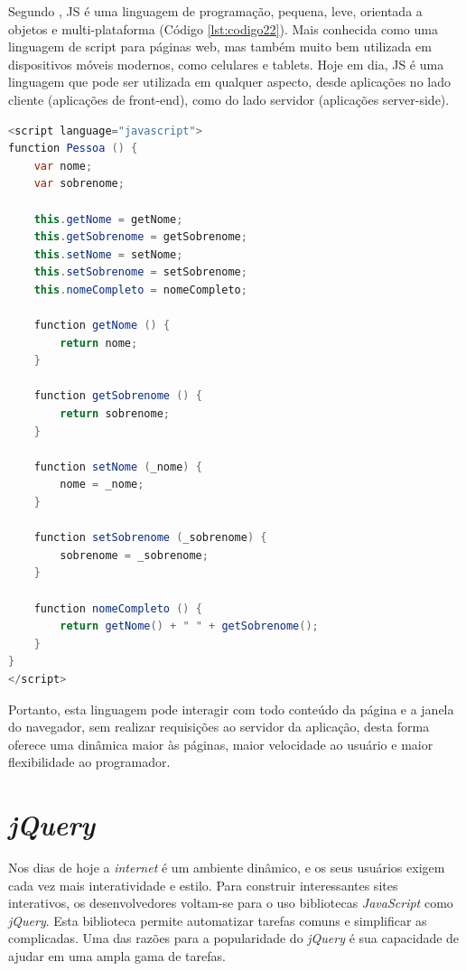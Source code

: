 Segundo , JS é uma linguagem de programação, pequena, leve, orientada a objetos e multi-plataforma (Código \ref{lst:codigo22}). Mais conhecida como uma linguagem de script para páginas web, mas também muito bem utilizada em dispositivos móveis modernos, como celulares e tablets. Hoje em dia, JS é uma linguagem que pode ser utilizada em qualquer aspecto, desde aplicações no lado cliente (aplicações de front-end), como do lado servidor (aplicações server-side).

{\singlespace
\begin{lstlisting}[caption=Classe Pessoa em \textit{JavaScript},language=Java,label={lst:codigo22}]
<script language="javascript">
function Pessoa () {
    var nome;
    var sobrenome;

    this.getNome = getNome;
    this.getSobrenome = getSobrenome;
    this.setNome = setNome;
    this.setSobrenome = setSobrenome;
    this.nomeCompleto = nomeCompleto;

    function getNome () {
        return nome;
    }

    function getSobrenome () {
        return sobrenome;
    }

    function setNome (_nome) {
        nome = _nome;
    }

    function setSobrenome (_sobrenome) {
        sobrenome = _sobrenome;
    }

    function nomeCompleto () {
        return getNome() + " " + getSobrenome();
    }
}
</script>
\end{lstlisting}
}

Portanto, esta linguagem pode interagir com todo conteúdo da página e a janela do navegador, sem realizar requisições ao servidor da aplicação, desta forma oferece uma dinâmica maior às páginas, maior velocidade ao usuário e maior flexibilidade ao programador.

\section{\textit{jQuery}}
\label{sec:jquery}

Nos dias de hoje a \textit{internet} é um ambiente dinâmico, e os seus usuários exigem cada vez mais interatividade e estilo. Para construir interessantes sites interativos, os desenvolvedores voltam-se para o uso bibliotecas \textit{JavaScript} como \textit{jQuery}. Esta biblioteca permite automatizar tarefas comuns e simplificar as complicadas. Uma das razões para a popularidade do \textit{jQuery} é sua capacidade de ajudar em uma ampla gama de tarefas.

